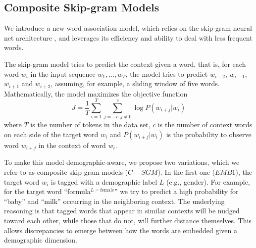 \documentclass[11pt,letterpaper]{article}
\begin{document}
\subsection{Composite Skip-gram Models}
We introduce a new word association model, which relies on the skip-gram neural net architecture \cite{Mikolov2013a}, and leverages its efficiency and  ability to deal with less frequent words. 

The skip-gram model tries to predict the context given a word, that is, for each word $w_i$ in the input sequence $w_1,\ldots,w_T$, the model tries to predict  $w_{i-2}$, $w_{i-1}$, $w_{i+1}$ and $w_{i+2}$, assuming, for example, a sliding window of five words. Mathematically, the model maximizes the objective function
\vspace{-0.5cm}
\begin{equation}
    J = \frac{1}{T}\sum_{i=1}^T\sum_{    j=-c, j\neq 0}^c \log P(w_{i+j}|w_i)
\end{equation}
\noindent where $T$ is the number of tokens in the data set, $c$ is the number of context words on each side of the target word $w_i$ and $P(w_{i+j}|w_i)$ is the probability to observe word $w_{i+j}$ in the context of word $w_i$.

\begin{comment}
\begin{quote}
If your baby prefers warm formula or milk place a filled bottle in a bowl of warm water and let it stand for a few minutes.
\end{quote}
\end{comment}

To make this model demographic-aware, we propose two variations, which we refer to as composite skip-gram models ($C-SGM$). In the first one ($EMB1$), the target word $w_i$ is tagged with a demographic label $L$ (e.g., gender). For example, for the target word ``formula$^{L=\text{female}}$'' we try to predict a high probability for ``baby'' and ``milk'' occurring in the neighboring context. The underlying reasoning is that tagged words that appear in similar contexts will be nudged toward each other, while those that do not, will further distance themselves. This allows discrepancies to emerge between how the words are embedded given a demographic dimension. 
\end{document}
